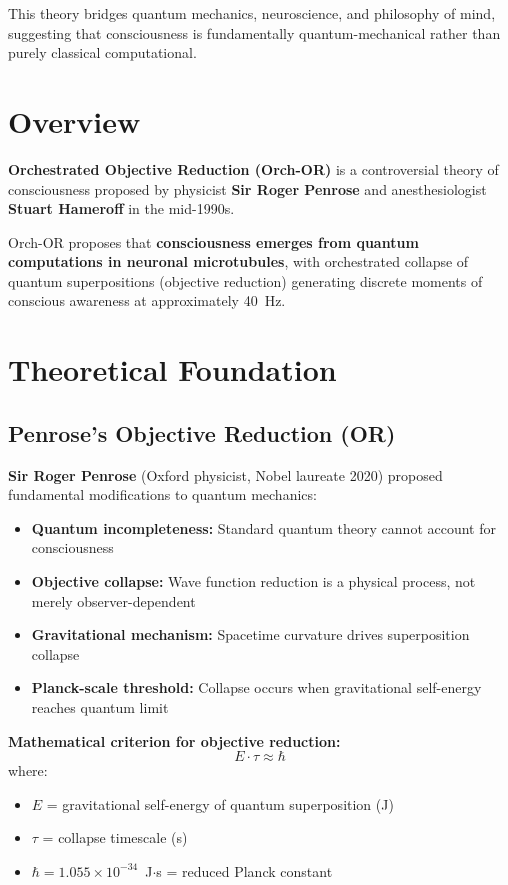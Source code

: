 This theory bridges quantum mechanics, neuroscience, and philosophy of mind, suggesting that consciousness is fundamentally quantum-mechanical rather than purely classical computational.



\section{Overview}

\textbf{Orchestrated Objective Reduction (Orch-OR)} is a controversial theory of consciousness proposed by physicist \textbf{Sir Roger Penrose} and anesthesiologist \textbf{Stuart Hameroff} in the mid-1990s.

\begin{keyconcept}
Orch-OR proposes that \textbf{consciousness emerges from quantum computations in neuronal microtubules}, with orchestrated collapse of quantum superpositions (objective reduction) generating discrete moments of conscious awareness at approximately 40~Hz.
\end{keyconcept}

\section{Theoretical Foundation}

\subsection{Penrose's Objective Reduction (OR)}

\textbf{Sir Roger Penrose} (Oxford physicist, Nobel laureate 2020) proposed fundamental modifications to quantum mechanics:

\begin{itemize}
\item \textbf{Quantum incompleteness:} Standard quantum theory cannot account for consciousness
\item \textbf{Objective collapse:} Wave function reduction is a physical process, not merely observer-dependent
\item \textbf{Gravitational mechanism:} Spacetime curvature drives superposition collapse
\item \textbf{Planck-scale threshold:} Collapse occurs when gravitational self-energy reaches quantum limit
\end{itemize}

\textbf{Mathematical criterion for objective reduction:}
\begin{equation}
\label{eq:or-criterion}
E \cdot \tau \approx \hbar
\end{equation}
where:
\begin{itemize}
\item $E$ = gravitational self-energy of quantum superposition (J)
\item $\tau$ = collapse timescale (s)
\item $\hbar = 1.055 \times 10^{-34}$~J$\cdot$s = reduced Planck constant
\end{itemize}

